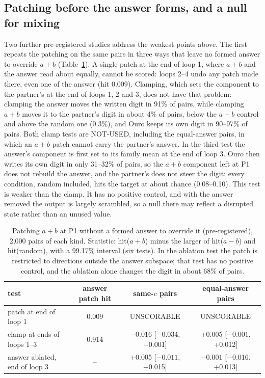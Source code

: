 \documentclass{article}
\begin{document}
\subsection{Patching before the answer forms, and a null for mixing}\label{sec:early}

Two further pre-registered studies address the weakest points above. The first repeats the patching on the same pairs in three ways that leave no formed answer to override $a+b$ (Table~\ref{tab:early}). A single patch at the end of loop 1, where $a+b$ and the answer read about equally, cannot be scored: loops 2--4 undo any patch made there, even one of the answer (hit 0.009). Clamping, which sets the component to the partner's at the end of loops 1, 2 and 3, does not have that problem: clamping the answer moves the written digit in 91\% of pairs, while clamping $a+b$ moves it to the partner's digit in about 4\% of pairs, below the $a-b$ control and above the random one (0.3\%), and Ouro keeps its own digit in 90--97\% of pairs. Both clamp tests are NOT-USED, including the equal-answer pairs, in which an $a+b$ patch cannot carry the partner's answer. In the third test the answer's component is first set to its family mean at the end of loop 3. Ouro then writes its own digit in only 31--32\% of pairs, so the $a+b$ component left at P1 does not rebuild the answer, and the partner's does not steer the digit: every condition, random included, hits the target at about chance (0.08--0.10). This test is weaker than the clamp. It has no positive control, and with the answer removed the output is largely scrambled, so a null there may reflect a disrupted state rather than an unused value.

\begin{table}[t]
\centering
\caption{Patching $a+b$ at P1 without a formed answer to override it (pre-registered), 2,000 pairs of each kind. Statistic: hit($a+b$) minus the larger of hit($a-b$) and hit(random), with a 99.17\% interval (six tests). In the ablation test the patch is restricted to directions outside the answer subspace; that test has no positive control, and the ablation alone changes the digit in about 68\% of pairs.}
\label{tab:early}
\small
\begin{tabular}{@{}lccc@{}}
\toprule
test & answer patch hit & same-$c$ pairs & equal-answer pairs \\
\midrule
patch at end of loop 1 & 0.009 & UNSCORABLE & UNSCORABLE \\
clamp at ends of loops 1--3 & 0.914 & $-0.016$ [$-0.034$, +0.001] & +0.005 [$-0.001$, +0.012] \\
answer ablated, end of loop 3 & -- & +0.005 [$-0.011$, +0.015] & $-0.001$ [$-0.016$, +0.013] \\
\bottomrule
\end{tabular}
\end{table}
\end{document}
